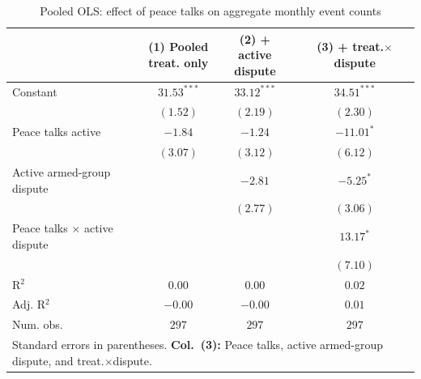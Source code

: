 
\begin{table}
\caption{Pooled OLS: effect of peace talks on aggregate monthly event counts}
\begin{center}
\begin{tabular}{l c c c}
\toprule
 & \makecell{(1) Pooled\\treat. only} & \makecell{(2) + active\\dispute} & \makecell{(3) + treat.$\times$\\dispute} \\
\midrule
Constant                     & $31.53^{***}$ & $33.12^{***}$ & $34.51^{***}$ \\
                             & $(1.52)$      & $(2.19)$      & $(2.30)$      \\
Peace talks active           & $-1.84$       & $-1.24$       & $-11.01^{*}$  \\
                             & $(3.07)$      & $(3.12)$      & $(6.12)$      \\
Active armed-group dispute   &               & $-2.81$       & $-5.25^{*}$   \\
                             &               & $(2.77)$      & $(3.06)$      \\
Peace talks × active dispute &               &               & $13.17^{*}$   \\
                             &               &               & $(7.10)$      \\
\midrule
R$^2$                        & $0.00$        & $0.00$        & $0.02$        \\
Adj. R$^2$                   & $-0.00$       & $-0.00$       & $0.01$        \\
Num. obs.                    & $297$         & $297$         & $297$         \\
\bottomrule
\multicolumn{4}{l}{\scriptsize{\parbox{\linewidth}{Standard errors in parentheses.\\[0.35em] \textbf{Col.~(3):} Peace talks, active armed-group dispute, and treat.$\times$dispute.}}}
\end{tabular}
\label{tab:results_pooled_ols}
\end{center}
\end{table}
